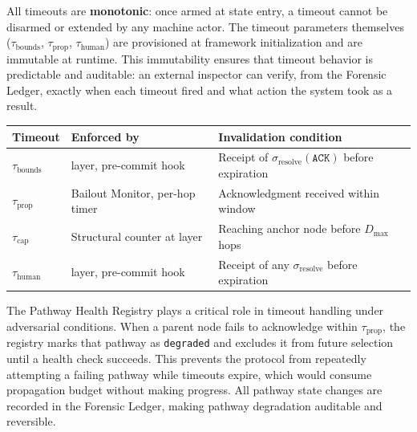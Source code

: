 All timeouts are \textbf{monotonic}: once armed at state entry, a timeout cannot be disarmed or extended by any machine actor. The timeout parameters themselves ($\tau_{\text{bounds}}$, $\tau_{\text{prop}}$, $\tau_{\text{human}}$) are provisioned at framework initialization and are immutable at runtime. This immutability ensures that timeout behavior is predictable and auditable: an external inspector can verify, from the Forensic Ledger, exactly when each timeout fired and what action the system took as a result.

\medskip
\noindent\begin{minipage}{\linewidth}
\label{tab:bp-timeout-enforcement}
\medskip
\noindent\begin{tabular}{lp{3cm}p{5cm}}
\toprule
\textbf{Timeout} & \textbf{Enforced by} & \textbf{Invalidation condition} \\
\midrule
$\tau_{\text{bounds}}$  & \fact{} layer, pre-commit hook & Receipt of $\sigma_{\text{resolve}}(\texttt{ACK})$ before expiration \\
$\tau_{\text{prop}}$   & Bailout Monitor, per-hop timer & Acknowledgment received within window \\
$\tau_{\text{cap}}$    & Structural counter at \fact{} layer & Reaching anchor node before $D_{\max}$ hops \\
$\tau_{\text{human}}$  & \fact{} layer, pre-commit hook & Receipt of any $\sigma_{\text{resolve}}$ before expiration \\
\bottomrule
\end{tabular}
\end{minipage}

The Pathway Health Registry plays a critical role in timeout handling under adversarial conditions. When a parent node fails to acknowledge within $\tau_{\text{prop}}$, the registry marks that pathway as \texttt{degraded} and excludes it from future selection until a health check succeeds. This prevents the protocol from repeatedly attempting a failing pathway while timeouts expire, which would consume propagation budget without making progress. All pathway state changes are recorded in the Forensic Ledger, making pathway degradation auditable and reversible.